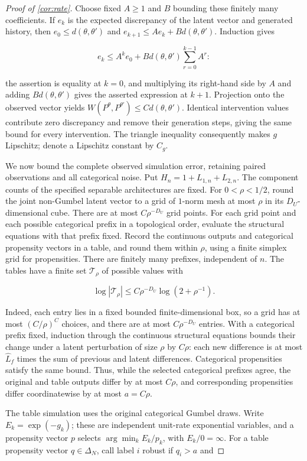 \begin{proof}[Proof of \cref{cor:rate}]
Choose fixed $A\geqslant1$ and $B$ bounding these finitely many coefficients. If $e_k$ is the expected discrepancy of the latent vector and generated history, then $e_0\leqslant d(\theta,\theta')$ and $e_{k+1}\leqslant Ae_k+Bd(\theta,\theta')$. Induction gives

\[
e_k\leqslant A^ke_0+Bd(\theta,\theta')\sum_{r=0}^{k-1}A^r:
\]

the assertion is equality at $k=0$, and multiplying its right-hand side by $A$ and adding $Bd(\theta,\theta')$ gives the asserted expression at $k+1$. Projection onto the observed vector yields $W(P^\theta,P^{\theta'})\leqslant C d(\theta,\theta')$. Identical intervention values contribute zero discrepancy and remove their generation steps, giving the same bound for every intervention. The triangle inequality consequently makes $g$ Lipschitz; denote a Lipschitz constant by $C_g$. 

We now bound the complete observed simulation error, retaining paired observations and all categorical noise. Put $H_n=1+L_{1,n}+L_{2,n}$. The component counts of the specified separable architectures are fixed. For $0<\rho<1/2$, round the joint non-Gumbel latent vector to a grid of $1$-norm mesh at most $\rho$ in its $D_U$-dimensional cube. There are at most $C\rho^{-D_U}$ grid points. For each grid point and each possible categorical prefix in a topological order, evaluate the structural equations with that prefix fixed. Record the continuous outputs and categorical propensity vectors in a table, and round them within $\rho$, using a finite simplex grid for propensities. There are finitely many prefixes, independent of $n$. The tables have a finite set $\mathcal T_\rho$ of possible values with

\[
\log|\mathcal T_\rho|\leqslant C\rho^{-D_U}\log(2+\rho^{-1}).
\]

Indeed, each entry lies in a fixed bounded finite-dimensional box, so a grid has at most $(C/\rho)^C$ choices, and there are at most $C\rho^{-D_U}$ entries. With a categorical prefix fixed, induction through the continuous structural equations bounds their change under a latent perturbation of size $\rho$ by $C\rho$: each new difference is at most $\hat L_f$ times the sum of previous and latent differences. Categorical propensities satisfy the same bound. Thus, while the selected categorical prefixes agree, the original and table outputs differ by at most $C\rho$, and corresponding propensities differ coordinatewise by at most $a=C\rho$. 

The table simulation uses the original categorical Gumbel draws. Write $E_k=\exp(-g_k)$; these are independent unit-rate exponential variables, and a propensity vector $p$ selects $\arg\min_k E_k/p_k$, with $E_k/0=\infty$. For a table propensity vector $q\in\Delta_N$, call label $i$ robust if $q_i>a$ and


\end{proof}
